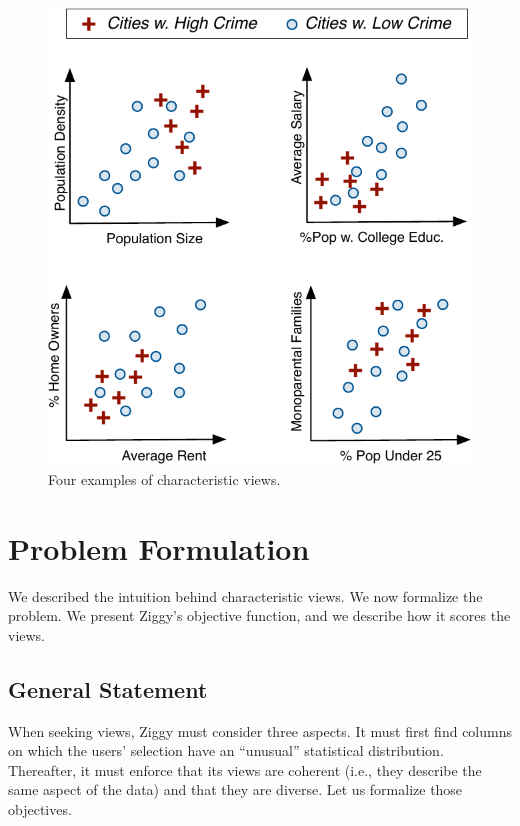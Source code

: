 \begin{figure}[t!] \centering
    \includegraphics[width=.8\columnwidth]{Images/CharacViews} \caption{Four
    examples of characteristic views.} \label{fig:characteristic-views}
\end{figure}


\section{Problem Formulation}
\label{sec:algorithm}

We described the intuition behind characteristic views.  We now formalize the
problem. We present Ziggy's objective function, and we describe how it scores
the views.

\subsection{General Statement} 
When seeking views, Ziggy must consider three aspects. It must first find
columns on which the users' selection have an ``unusual'' statistical
distribution.  Thereafter, it must enforce that its views are coherent (i.e.,
they describe the same aspect of the data) and that they are diverse.  Let us
formalize those objectives.

